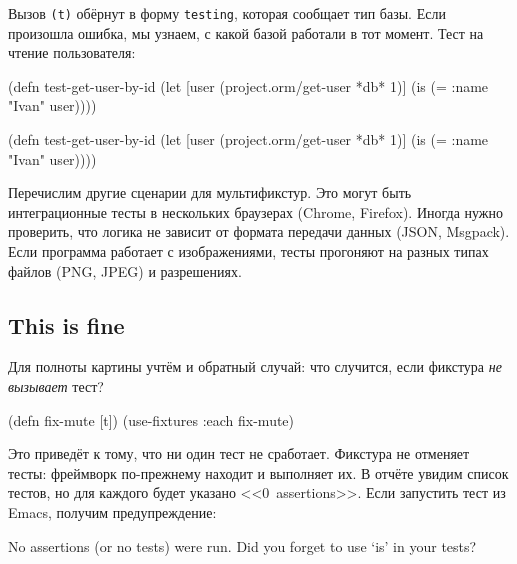 \fi

Вызов \verb|(t)| обёрнут в форму \verb|testing|, которая сообщает тип
базы. Если произошла ошибка, мы узнаем, с какой базой работали в тот
момент. Тест на чтение пользователя:

\ifx\devicetype\mobile

\begin{english}
  \begin{clojure}
(defn test-get-user-by-id
  (let [user
        (project.orm/get-user *db* 1)]
    (is (= {:name "Ivan"} user))))
  \end{clojure}
\end{english}

\else

\begin{english}
  \begin{clojure}
(defn test-get-user-by-id
  (let [user (project.orm/get-user *db* 1)]
    (is (= {:name "Ivan"} user))))
  \end{clojure}
\end{english}

\fi

Перечислим другие сценарии для мультификстур. Это могут быть интеграционные
тесты в нескольких браузерах (Chrome, Firefox). Иногда нужно проверить, что
логика не зависит от формата передачи данных (JSON, Msgpack). Если программа
работает с изображениями, тесты прогоняют на разных типах файлов (PNG, JPEG) и
разрешениях.

\subsection{This is fine}

Для полноты картины учтём и обратный случай: что случится, если фикстура
\emph{не вызывает} тест?


\begin{english}
  \begin{clojure}
(defn fix-mute [t])
(use-fixtures :each fix-mute)
  \end{clojure}
\end{english}

Это приведёт к тому, что ни один тест не сработает. Фикстура не отменяет тесты:
фреймворк по-прежнему находит и выполняет их. В отчёте увидим список тестов,
но для каждого будет указано <<0~assertions>>. Если запустить тест из Emacs,
получим предупреждение:

\begin{english}
  \begin{clojure}
No assertions (or no tests) were run.
Did you forget to use ‘is’ in your tests?
  \end{clojure}
\end{english}

